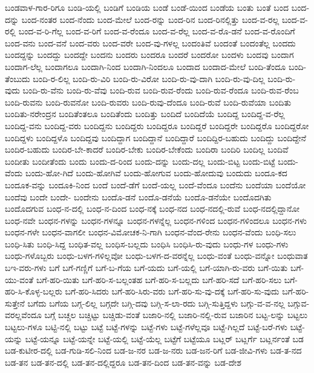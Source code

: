 {ಬಂಡವಾಳ-ಗಾರ-ರಿಗೂ
ಬಂಡಿ-ಯಲ್ಲಿ
ಬಂಡಿಗೆ
ಬಂಡಿಯ
ಬಂಡೆ
ಬಂಡೆ-ಯಿಂದ
ಬಂಡೆಯ
ಬಂತು
ಬಂತೆ
ಬಂದ
ಬಂದ-ದನ್ನು
ಬಂದ-ನಂತರ
ಬಂದ-ನೆಂದು
ಬಂದ-ಮೇಲೆ
ಬಂದ-ರನ್ನು
ಬಂದ-ರಿನ
ಬಂದ-ರಿನಲ್ಲಿತ್ತು
ಬಂದ-ವ-ರಲ್ಲ
ಬಂದ-ವ-ರಲ್ಲಿ
ಬಂದ-ವ-ರಿ-ಗೆಲ್ಲ
ಬಂದ-ವ-ರಿಗೆ
ಬಂದ-ವ-ರೆಂದೂ
ಬಂದ-ವ-ರೆಲ್ಲ
ಬಂದ-ವ-ರೊ-ಡನೆ
ಬಂದ-ವ-ರೊಂದಿಗೆ
ಬಂದ-ವನು
ಬಂದ-ವನೆ
ಬಂದ-ವರು
ಬಂದ-ವರೇ
ಬಂದ-ವು-ಗಳಲ್ಲ
ಬಂದಂತಿವೆ
ಬಂದಂತೆ
ಬಂದಂತೆಲ್ಲ
ಬಂದದು
ಬಂದದ್ದನ್ನು
ಬಂದದ್ದು
ಬಂದದ್ದೇ
ಬಂದನು
ಬಂದರು
ಬಂದರೂ
ಬಂದರೆ
ಬಂದರೋ
ಬಂದಳು
ಬಂದವು
ಬಂದಾಗ
ಬಂದಾಗ-ಲೆಲ್ಲ
ಬಂದಾಗಲೂ
ಬಂದಾಗಿ-ನಿಂದ
ಬಂದಾಗಿ-ನಿಂದಲೂ
ಬಂದಾದ
ಬಂದಾದ-ಮೇಲೆ
ಬಂದಿ-ತೆಂದೂ
ಬಂದಿ-ತೆಂಬುದು
ಬಂದಿ-ರ-ಲಿಲ್ಲ
ಬಂದಿ-ರು-ವಿರಿ
ಬಂದಿ-ರು-ವಿರೋ
ಬಂದಿ-ರು-ವು-ದಾಗಿ
ಬಂದಿ-ರು-ವು-ದಿಲ್ಲ
ಬಂದಿ-ರು-ವುದು
ಬಂದಿ-ರು-ವೆನು
ಬಂದಿ-ರು-ವೆವು
ಬಂದಿ-ರುವ
ಬಂದಿ-ರುವ-ರೆಂದು
ಬಂದಿ-ರುವ-ರೆಂದೂ
ಬಂದಿ-ರುವ-ರೆಂಬ
ಬಂದಿ-ರುವನು
ಬಂದಿ-ರುವನೋ
ಬಂದಿ-ರುವರು
ಬಂದಿ-ರುವು-ದೆಂದೂ
ಬಂದಿ-ರುವೆ
ಬಂದಿ-ರುವೆಯಾ
ಬಂದಿತು
ಬಂದಿತು-ನರೇಂದ್ರನ
ಬಂದಿತೆಂತಲೂ
ಬಂದಿತೆಂದು
ಬಂದಿತ್ತು
ಬಂದಿದೆ
ಬಂದಿದೆಯೆ
ಬಂದಿದ್ದ
ಬಂದಿದ್ದ-ವ-ರೆಲ್ಲ
ಬಂದಿದ್ದ-ವನು
ಬಂದಿದ್ದ-ವರು
ಬಂದಿದ್ದನು
ಬಂದಿದ್ದರು
ಬಂದಿದ್ದರೂ
ಬಂದಿದ್ದರೆ
ಬಂದಿದ್ದರೇ
ಬಂದಿದ್ದರೊ
ಬಂದಿದ್ದರೋ
ಬಂದಿದ್ದಳು
ಬಂದಿದ್ದಳೊ
ಬಂದಿದ್ದವು
ಬಂದಿದ್ದಾಗ
ಬಂದಿದ್ದಾನೆ
ಬಂದಿದ್ದಾರೆ
ಬಂದಿದ್ದಿರ-ಬಹುದು
ಬಂದಿದ್ದು
ಬಂದಿದ್ದೇನೆ
ಬಂದಿರ-ಬಹುದು
ಬಂದಿರ-ಬೇ-ಕಾದರೆ
ಬಂದಿರ-ಬೇಕು
ಬಂದಿರ-ಬೇಕೆಂದು
ಬಂದಿರಾ
ಬಂದಿರಿ
ಬಂದಿಲ್ಲ
ಬಂದಿವೆ
ಬಂದೀತು
ಬಂದೀತೆಂದು
ಬಂದು
ಬಂದು-ದ-ರಿಂದ
ಬಂದು-ದನ್ನು
ಬಂದು-ದಲ್ಲ
ಬಂದು-ಬಿಟ್ಟ
ಬಂದು-ಬಿಟ್ಟೆ
ಬಂದು-ವೆಂದು
ಬಂದು-ಹೋ-ಗಿದೆ
ಬಂದು-ಹೋಗಿವೆ
ಬಂದು-ಹೋಗುವ
ಬಂದು-ಹೋದುವು
ಬಂದುದು
ಬಂದೂ-ಕದ
ಬಂದೂಕ-ವನ್ನು
ಬಂದೂಕಿ-ನಿಂದ
ಬಂದೆ
ಬಂದೆ-ಡೆಗೆ
ಬಂದೆ-ಯಲ್ಲ
ಬಂದೆ-ವೆಂದೂ
ಬಂದೆನು
ಬಂದೆಯಾ
ಬಂದೆಯೋ
ಬಂದೆವು
ಬಂದೇ
ಬಂದೇ-
ಬಂದೇನು
ಬಂದೊ-ಡನೆ
ಬಂದೊ-ಡನೆಯೆ
ಬಂದೊ-ಡನೆಯೇ
ಬಂದೊದಗಿತು
ಬಂದೊದಗುವ
ಬಂಧ-ನ-ದಲ್ಲಿ
ಬಂಧ-ನ-ದಿಂದ
ಬಂಧ-ನಕ್ಕೆ
ಬಂಧ-ನದ
ಬಂಧ-ನದಲ್ಲಿ-ರುವೆ
ಬಂಧ-ನದಲ್ಲಿದ್ದಾನೋ
ಬಂಧ-ನವೇ
ಬಂಧನ-ಗಳನ್ನು
ಬಂಧನ-ಗಳನ್ನೂ
ಬಂಧನ-ಗಳನ್ನೆಲ್ಲ
ಬಂಧನ-ಗಳಿಂದ
ಬಂಧನ-ಗಳಿಂದಲೂ
ಬಂಧನ-ಗಳು
ಬಂಧನ-ಗಳೇ
ಬಂಧನ-ವಾಗಲೀ
ಬಂಧನ-ವಿಮೋಚಕ-ನಿ-ಗಾಗಿ
ಬಂಧನ-ವೆಂದ-ರೇನು
ಬಂಧನ-ವೆಂದು
ಬಂಧಿ-ಸಲು
ಬಂಧಿ-ಸಿತು
ಬಂಧಿ-ಸಿದ್ದ
ಬಂಧಿತ-ವಲ್ಲ
ಬಂಧಿಸ-ಬಲ್ಲದು
ಬಂಧಿಸಿ
ಬಂಧಿಸಿ-ರು-ವುದು
ಬಂಧು-ಗಳ
ಬಂಧು-ಗಳು
ಬಂಧು-ಗಳೊಬ್ಬರು
ಬಂಧು-ಬಳಗ-ಗಳಿಲ್ಲವೋ
ಬಂಧು-ಬಳಗ-ದ-ವರನ್ನೆಲ್ಲ
ಬಂಧು-ವಂತೆ
ಬಂಧು-ವನ್ನೋ
ಬಂಧುವಾತ
ಬಇ-ವರು-ಗಳು
ಬಗೆ
ಬಗೆ-ಗಣ್ಣಿಗೆ
ಬಗೆ-ಬ-ಗೆಯ
ಬಗೆ-ಯದು
ಬಗೆ-ಯಲ್ಲಿ
ಬಗೆ-ಯಾಗಿ-ರು-ವರು
ಬಗೆ-ಯಿತು
ಬಗೆ-ಯು-ವಂತೆ
ಬಗೆ-ಹರಿ-ಯಿತು
ಬಗೆ-ಹರಿ-ಸ-ಬಲ್ಲಂತಹ
ಬಗೆ-ಹರಿ-ಸ-ಬಲ್ಲದು
ಬಗೆ-ಹರಿ-ಸದೆ
ಬಗೆ-ಹರಿ-ಸಲು
ಬಗೆ-ಹರಿ-ಸಿ-ಕೊಳ್ಳ-ಬಲ್ಲರು
ಬಗೆ-ಹರಿ-ಸಿದರು
ಬಗೆ-ಹರಿ-ಸಿರು-ವರು
ಬಗೆ-ಹರಿ-ಸು-ವು-ದಕ್ಕೆ
ಬಗೆ-ಹರಿ-ಸು-ವುದು
ಬಗೆ-ಹರಿ-ಸುತ್ತೇನೆ
ಬಗೆದು
ಬಗೆಯ
ಬಗ್ಗ-ಲಿಲ್ಲ
ಬಗ್ಗದೇ
ಬಗ್ಗಿ-ದವು
ಬಗ್ಗಿ-ಸ-ಲಾ-ರದು
ಬಗ್ಗಿ-ಸುತ್ತಿದ್ದಳು
ಬಗ್ಗು-ವ-ವ-ನಲ್ಲ
ಬಗ್ಗುವ-ವರಲ್ಲವೆಂದೂ
ಬಗ್ಗೆ
ಬಚ್ಚಲ
ಬಚ್ಚಿಟ್ಟು
ಬಚ್ಚಿಡು-ವಂತೆ
ಬಜಾರಿ-ನಲ್ಲಿ
ಬಜಾರಿ-ನಲ್ಲಿ-ರುವ
ಬಜಾರಿನ
ಬಟ್ಟ-ಲನ್ನು
ಬಟ್ಟಲು
ಬಟ್ಟಲು-ಗಳೂ
ಬಟ್ಟಿ-ನಲ್ಲಿ
ಬಟ್ಟು
ಬಟ್ಟೆ
ಬಟ್ಟೆ-ಗಳನ್ನು
ಬಟ್ಟೆ-ಗಳು
ಬಟ್ಟೆ-ಗಳೆಲ್ಲವೂ
ಬಟ್ಟೆ-ಗಿಲ್ಲದೆ
ಬಟ್ಟೆ-ಬರೆ-ಗಳು
ಬಟ್ಟೆ-ಯನ್ನು
ಬಟ್ಟೆ-ಯನ್ನೂ
ಬಟ್ಟೆ-ಯನ್ನೇ
ಬಟ್ಟೆ-ಯಲ್ಲಿ
ಬಟ್ಟೆ-ಯೆಲ್ಲ
ಬಟ್ಟೆಗೆ
ಬಟ್ಟೆಯೂ
ಬಟ್ಲರ್
ಬಟ್ಲರ್ಗೆ
ಬಟ್ಲರ್ನಂತೆ
ಬಡ
ಬಡ-ಕುಟೀರ-ದಲ್ಲಿ
ಬಡ-ಗುಡಿ-ಸಲಿ-ನಿಂದ
ಬಡ-ಜ-ನರ
ಬಡ-ಜ-ನರು
ಬಡ-ಜನ-ರಿಗೆ
ಬಡ-ಜೀವಿ-ಗಳು
ಬಡ-ತ-ನದ
ಬಡ-ತನ
ಬಡ-ತನ-ದಲ್ಲಿ
ಬಡ-ತನ-ದಲ್ಲಿದ್ದರೂ
ಬಡ-ತನ-ದಿಂದ
ಬಡ-ತನ-ವನ್ನು
ಬಡ-ದೇಶ
}
